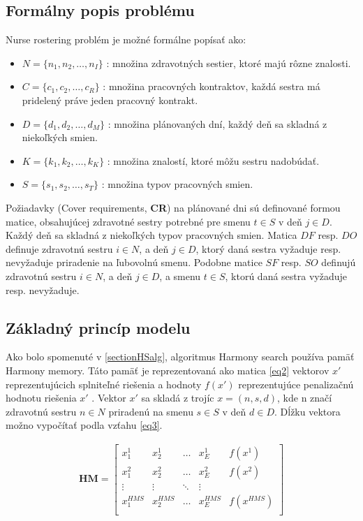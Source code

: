 \documentclass[a4paper, 14pt]{article}
\begin{document}
\subsection{Formálny popis problému}
Nurse rostering problém je možné formálne popísať ako:
\begin{itemize}
\item $N = \{n_1, n_2, \dots, n_I \} $ : množina zdravotných sestier, ktoré majú rôzne znalosti.
\item $C = \{c_1, c_2, \dots, c_R \} $ : množina pracovných kontraktov, každá sestra má pridelený práve jeden pracovný kontrakt.
\item $D = \{d_1, d_2, \dots, d_M \} $ : množina plánovaných dní, každý deň sa skladná z niekoľkých smien.
\item $K = \{k_1, k_2, \dots, k_K \} $ : množina znalostí, ktoré môžu sestru nadobúdať.
\item $S = \{s_1, s_2, \dots, s_T \} $ : množina typov pracovných smien.
\end{itemize}
Požiadavky (Cover requirements, \textbf{CR}) na plánované dni sú definované formou matice, obsahujúcej zdravotné sestry potrebné pre smenu $t \in S$ v deň $j \in D$. Každý deň sa skladná z niekoľkých typov pracovných smien. Matica $DF$ resp. $DO$ definuje zdravotnú sestru $i \in N$, a deň  $j \in D$, ktorý daná sestra vyžaduje resp. nevyžaduje priradenie na ľubovolnú smenu. Podobne matice $SF$ resp. $SO$ definujú zdravotnú sestru $i \in N$, a deň  $j \in D$, a smenu $t \in S$, ktorú daná sestra vyžaduje resp. nevyžaduje.\\

\subsection{Základný princíp modelu}
Ako bolo spomenuté v \ref{sectionHSalg}, algoritmus Harmony search používa pamäť Harmony memory. Táto pamäť je reprezentovaná ako matica \ref{eq2} vektorov $x'$ reprezentujúcich splniteľné riešenia a  hodnoty $f(x')$ reprezentujúce penalizačnú hodnotu riešenia $x'$ . Vektor $x'$ sa skladá z trojíc $x = (n,s,d)$, kde n značí zdravotnú sestru $n \in N$ priradenú na smenu $s \in S$ v deň $d \in D$. Dĺžku vektora možno vypočítať podla vzťahu \ref{eq3}.   

\begin{center}
\begin{eqnarray}
\label{eq2}
\mathbf{HM}=\left[
\begin{array}{ccccc}
x_1^1 & x_2^1 & \ldots & x_E^1 & f(x^1)\\
x_1^2 & x_2^2 & \ldots & x_E^2 & f(x^2) \\
\vdots & \vdots & \ddots & \vdots \\
x_1^{HMS} & x_2^{HMS} & \ldots & x_E^{HMS} & f(x^{HMS})\\
\end{array}\right]
\end{eqnarray}
\end{center}
\end{document}

